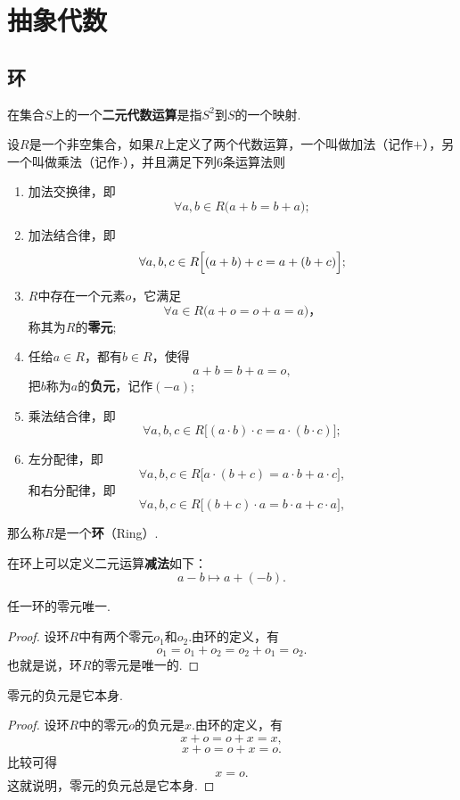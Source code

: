 \section{抽象代数}
\subsection{环}
\begin{definition}
在集合\(S\)上的一个\textbf{二元代数运算}是指\(S^2\)到\(S\)的一个映射.
\end{definition}

\begin{definition}
设\(R\)是一个非空集合，如果\(R\)上定义了两个代数运算，一个叫做加法（记作\(+\)），另一个叫做乘法（记作\(\cdot\)），并且满足下列6条运算法则\begin{enumerate}
\item 加法交换律，即\[
\forall a,b \in R \bigl(a+b = b+a\bigr);
\]
\item 加法结合律，即\[
\forall a,b,c \in R \Bigl[(a+b)+c = a+(b+c)\Bigr];
\]
\item \(R\)中存在一个元素\(o\)，它满足\[
\forall a \in R \bigl( a+o = o+a = a \bigr)，%
\]称其为\(R\)的\textbf{零元};
\item 任给\(a \in R\)，都有\(b \in R\)，使得\[
a+b = b+a = o,
\]把\(b\)称为\(a\)的\textbf{负元}，记作\((-a)\);
\item 乘法结合律，即\[
\forall a,b,c \in R \bigl[ (a \cdot b) \cdot c = a \cdot (b \cdot c) \bigr];
\]
\item 左分配律，即\[
\forall a,b,c \in R \bigl[ a \cdot (b+c) = a \cdot b + a \cdot c \bigr],
\]和右分配律，即\[
\forall a,b,c \in R \bigl[ (b+c) \cdot a = b \cdot a + c \cdot a \bigr],
\]
\end{enumerate}那么称\(R\)是一个\textbf{环}（Ring）.

在环上可以定义二元运算\textbf{减法}如下：\[
a - b \mapsto a + (-b).
\]
\end{definition}

\begin{property}
任一环的零元唯一.
\begin{proof}
设环\(R\)中有两个零元\(o_1\)和\(o_2\).由环的定义，有\[
o_1 = o_1 + o_2 = o_2 + o_1 = o_2.
\]也就是说，环\(R\)的零元是唯一的.
\end{proof}
\end{property}

\begin{property}
零元的负元是它本身.
\begin{proof}
设环\(R\)中的零元\(o\)的负元是\(x\).由环的定义，有\[
x + o = o + x = x,
\]\[
x + o = o + x = o.
\]比较可得\[
x = o.
\]这就说明，零元的负元总是它本身.
\end{proof}
\end{property}

